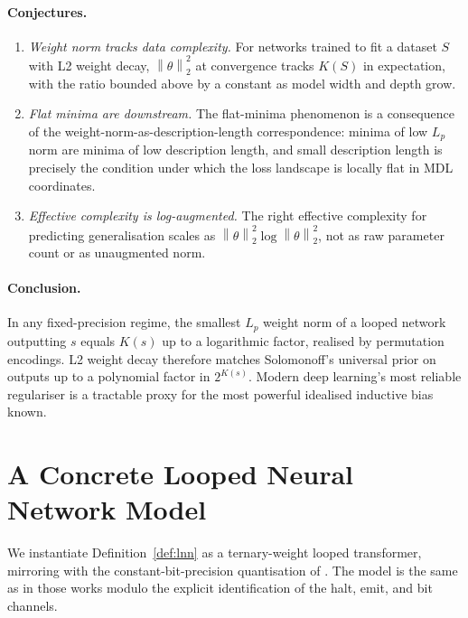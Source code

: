 \documentclass{article}
\theoremstyle{definition}
\newcommand{\norm}[1]{\left\lVert#1\right\rVert}
\begin{document}
\paragraph{Conjectures.}
\begin{enumerate}
  \item \emph{Weight norm tracks data complexity.} For networks trained to fit a
        dataset $S$ with L2 weight decay, $\norm{\theta}_2^2$ at convergence tracks
        $K(S)$ in expectation, with the ratio bounded above by a constant as model
        width and depth grow.
  \item \emph{Flat minima are downstream.} The flat-minima phenomenon
        \citep{hochreiter1997flat} is a consequence of the weight-norm-as-description-length
        correspondence: minima of low $L_p$ norm are minima of low description length, and
        small description length is precisely the condition under which the loss landscape
        is locally flat in MDL coordinates.
  \item \emph{Effective complexity is log-augmented.} The right effective complexity for
        predicting generalisation scales as $\norm{\theta}_2^2 \log \norm{\theta}_2^2$,
        not as raw parameter count or as unaugmented norm.
\end{enumerate}

\paragraph{Conclusion.} In any fixed-precision regime, the smallest $L_p$ weight norm of a looped
network outputting $s$ equals $K(s)$ up to a logarithmic factor, realised by
permutation encodings. L2 weight decay therefore matches Solomonoff's universal
prior on outputs up to a polynomial factor in $2^{K(s)}$. Modern deep
learning's most reliable regulariser is a tractable proxy for the most powerful
idealised inductive bias known.

\newpage




\appendix

\section{A Concrete Looped Neural Network Model}\label{app:model}

We instantiate Definition~\ref{def:lnn} as a ternary-weight looped transformer,
mirroring \citet{giannou2023looped} with the constant-bit-precision
quantisation of \citet{li2025constant}. The model is the same as in those works
modulo the explicit identification of the halt, emit, and bit channels.
\end{document}

